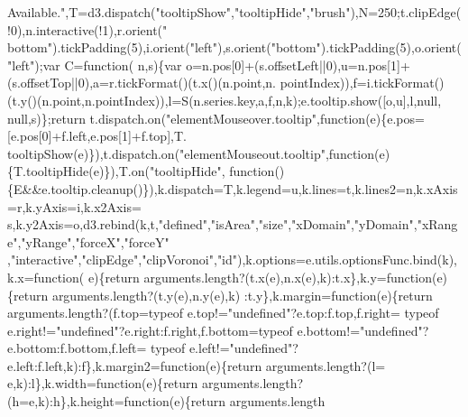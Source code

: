 \begin{DoxyCode}
{{       Available."},T=d3.dispatch(\textcolor{stringliteral}{"tooltipShow"},\textcolor{stringliteral}{"tooltipHide"},\textcolor{stringliteral}{"brush"}),N=250;t.clipEdge(!0),n.interactive(!1),r.orient(\textcolor{stringliteral}{"
      bottom"}).tickPadding(5),i.orient(\textcolor{stringliteral}{"left"}),s.orient(\textcolor{stringliteral}{"bottom"}).tickPadding(5),o.orient(\textcolor{stringliteral}{"left"});var C=\textcolor{keyword}{function}(
      n,s)\{var o=n.pos[0]+(s.offsetLeft||0),u=n.pos[1]+(s.offsetTop||0),a=r.tickFormat()(t.x()(n.point,n.
      pointIndex)),f=i.tickFormat()(t.y()(n.point,n.pointIndex)),l=S(n.series.key,a,f,n,k);e.tooltip.show([o,u],l,null,
      null,s)\};\textcolor{keywordflow}{return} t.dispatch.on(\textcolor{stringliteral}{"elementMouseover.tooltip"},\textcolor{keyword}{function}(e)\{e.pos=[e.pos[0]+f.left,e.pos[1]+f.top],T.
      tooltipShow(e)\}),t.dispatch.on(\textcolor{stringliteral}{"elementMouseout.tooltip"},\textcolor{keyword}{function}(e)\{T.tooltipHide(e)\}),T.on(\textcolor{stringliteral}{"tooltipHide"},\textcolor{keyword}{
      function}()\{E&&e.tooltip.cleanup()\}),k.dispatch=T,k.legend=u,k.lines=t,k.lines2=n,k.xAxis=r,k.yAxis=i,k.x2Axis=
      s,k.y2Axis=o,d3.rebind(k,t,\textcolor{stringliteral}{"defined"},\textcolor{stringliteral}{"isArea"},\textcolor{stringliteral}{"size"},\textcolor{stringliteral}{"xDomain"},\textcolor{stringliteral}{"yDomain"},\textcolor{stringliteral}{"xRange"},\textcolor{stringliteral}{"yRange"},\textcolor{stringliteral}{"forceX"},\textcolor{stringliteral}{"forceY"}
      ,\textcolor{stringliteral}{"interactive"},\textcolor{stringliteral}{"clipEdge"},\textcolor{stringliteral}{"clipVoronoi"},\textcolor{stringliteral}{"id"}),k.options=e.utils.optionsFunc.bind(k),k.x=\textcolor{keyword}{function}(
      e)\{\textcolor{keywordflow}{return} arguments.length?(t.x(e),n.x(e),k):t.x\},k.y=\textcolor{keyword}{function}(e)\{\textcolor{keywordflow}{return} arguments.length?(t.y(e),n.y(e),k)
      :t.y\},k.margin=\textcolor{keyword}{function}(e)\{\textcolor{keywordflow}{return} arguments.length?(f.top=typeof e.top!=\textcolor{stringliteral}{"undefined"}?e.top:f.top,f.right=
      typeof e.right!=\textcolor{stringliteral}{"undefined"}?e.right:f.right,f.bottom=typeof e.bottom!=\textcolor{stringliteral}{"undefined"}?e.bottom:f.bottom,f.left=
      typeof e.left!=\textcolor{stringliteral}{"undefined"}?e.left:f.left,k):f\},k.margin2=\textcolor{keyword}{function}(e)\{\textcolor{keywordflow}{return} arguments.length?(l=
      e,k):l\},k.width=\textcolor{keyword}{function}(e)\{\textcolor{keywordflow}{return} arguments.length?(h=e,k):h\},k.height=\textcolor{keyword}{function}(e)\{\textcolor{keywordflow}{return} arguments.length
}
\end{DoxyCode}
